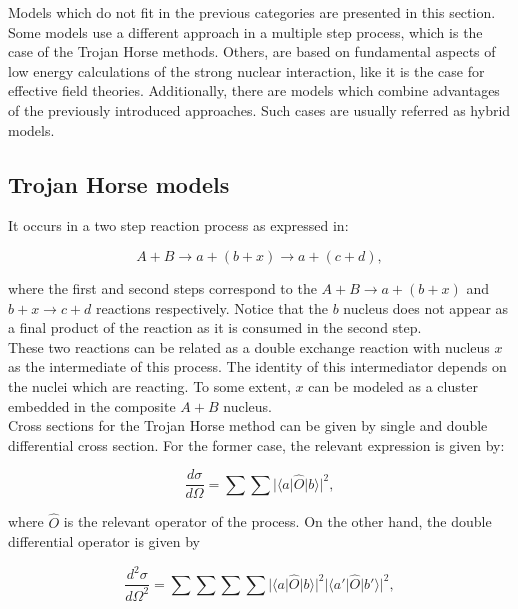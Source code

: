 \documentclass[openany]{book}
\begin{document}
Models which do not fit in the previous categories are presented in this section. Some models use a different approach in a multiple step process, which is the case of the Trojan Horse methods. Others, are based on fundamental aspects of low energy calculations of the strong nuclear interaction, like it is the case for effective field theories. Additionally, there are models which combine advantages of the previously introduced approaches. Such cases are usually referred as hybrid models.

\subsection{Trojan Horse models} \label{sub:special_trojanHorse}

It occurs in a two step reaction process as expressed in:

\begin{equation}\label{eq: special_trojanHorse_reaction}
	A + B \rightarrow a + (b + x)\rightarrow a + (c + d),
\end{equation}

where the first and second steps correspond to the $A + B \rightarrow a + (b + x)$ and $b + x \rightarrow c + d$ reactions respectively. Notice that the $b$ nucleus does not appear as a final product of the reaction as it is consumed in the second step. \\

These two reactions can be related as a double exchange reaction with nucleus $x$ as the intermediate of this process. The identity of this intermediator depends on the nuclei which are reacting. To some extent, $x$ can be modeled as a cluster embedded in the composite $A + B$ nucleus. \\ 

Cross sections for the Trojan Horse method can be given by single and double differential cross section. For the former case, the relevant expression is given by: 

\begin{equation}\label{eq: special_differential_single}
	\frac{d\sigma}{d\Omega} = \sum \sum |\langle a | \hat O | b  \rangle|^2,
\end{equation}

where $\hat O$ is the relevant operator of the process. On the other hand, the double differential operator is given by 

\begin{equation}\label{eq: special_differential_double}
	\frac{d^2\sigma}{d\Omega^2} = \sum \sum \sum \sum  |\langle a | \hat O | b \rangle|^2 |\langle a' | \hat O | b' \rangle|^2,
\end{equation}
\end{document}
